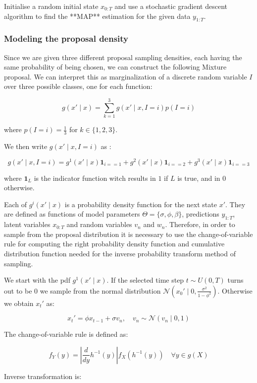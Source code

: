 \documentclass[]{article}
\begin{document}
Initialise a random initial state $x_{0:T}$ and use a stochastic gradient descent algorithm to find the **MAP** estimation for the given data $y_{1:T}$.

\subsubsection*{Modeling the proposal density}

Since we are given three different proposal sampling densities, each having the same probability of being chosen, we can construct the following Mixture proposal. We can interpret this as marginalization of a discrete random variable $I$ over three possible classes, one for each function:

$$ g(x' \mid x) = \sum_{k=1}^3 g(x' \mid x, I=i) p(I=i) $$

where $p(I=i)=\frac{1}{3}$ for $ k \in \{ 1,2,3 \}$. 

We then write $ g(x' \mid x, I=i) $ as :

$$ g(x' \mid x, I=i) = g^1(x' \mid x)  \mathbf{1}_{i==1} + g^2(x' \mid x)  \mathbf{1}_{i==2} + g^3(x' \mid x)  \mathbf{1}_{i==3}  $$

where $\mathbf{1}_{L}$ is the indicator function witch results in $1$ if $L$ is true, and in $0$ otherwise. 

Each of $g^i(x' \mid x)$ is a probability density function for the next state $x'$. They are defined as functions of model parameters $\Theta = \{ \sigma, \phi, \beta \}$, predictions $y_{1:T}$, latent variables $x_{0:T}$ and random variables $v_n$ and $w_n$. Therefore, in order to sample from the proposal distribution it is necessary to use the change-of-variable rule for computing the right probability density function and cumulative distribution function needed for the inverse probability transform method of sampling. 

We start with the pdf $g^1(x' \mid x)$. If the selected time step $ t \sim U(0,T)$ turns out to be $0$ we sample from the normal distribution $\mathcal{N}(x_0' \mid 0, \frac{\sigma^2}{1-\phi^2})$. Otherwise we obtain $x_t'$ as:

$$ x_t' = \phi x_{t-1} + \sigma v_n , \quad v_n \sim \mathcal{N}(v_n \mid 0,1) $$

The change-of-variable rule is defined as:

$$ f_Y(y) = \left | \frac{d}{dy} h^{-1}(y) \right | f_X(h^{-1}(y)) \quad \forall y \in g(X)$$

Inverse transformation is:
\end{document}
